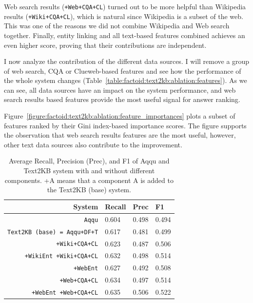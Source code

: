 Web search results (\texttt{+Web+CQA+CL}) turned out to be more helpful than Wikipedia results (\texttt{+Wiki+CQA+CL}), which is natural since Wikipedia is a subset of the web.
This was one of the reasons we did not combine Wikipedia and Web search together.
Finally, entity linking and all text-based features combined achieves an even higher score, proving that their contributions are independent.

I now analyze the contribution of the different data sources.
I will remove a group of web search, CQA or Clueweb-based features and see how the performance of the whole system changes (Table~\ref{table:factoid:text2kb:ablation:features}).
As we can see, all data sources have an impact on the system performance, and web search results based features provide the most useful signal for answer ranking.

Figure~\ref{figure:factoid:text2kb:ablation:feature_importances} plots a subset of features ranked by their Gini index-based importance scores.
The figure supports the observation that web search results features are the most useful, however, other text data sources also contribute to the improvement.

\begin{table}
\centering
\begin{tabular}{rlll}
System & Recall & Prec & F1 \\
\hline
\texttt{Aqqu} & 0.604 & 0.498 & 0.494\\
\texttt{Text2KB (base) = Aqqu+DF+T} & 0.617 & 0.481 & 0.499 \\
\hline
\texttt{+Wiki+CQA+CL} & 0.623 & 0.487 & 0.506 \\
\texttt{+WikiEnt +Wiki+CQA+CL} & 0.632 & 0.498 & 0.514 \\
\hline
\texttt{+WebEnt} & 0.627 & 0.492 & 0.508 \\
\texttt{+Web+CQA+CL} & 0.634 & 0.497 & 0.514 \\
\texttt{+WebEnt +Web+CQA+CL} & 0.635 & 0.506 & 0.522 \\
\end{tabular}
\caption{Average Recall, Precision (Prec), and F1 of Aqqu and Text2KB system with and without different components. +A means that a component A is added to the Text2KB (base) system.}
\label{table:factoid:text2kb:ablation:entities_vs_features}
\end{table}

